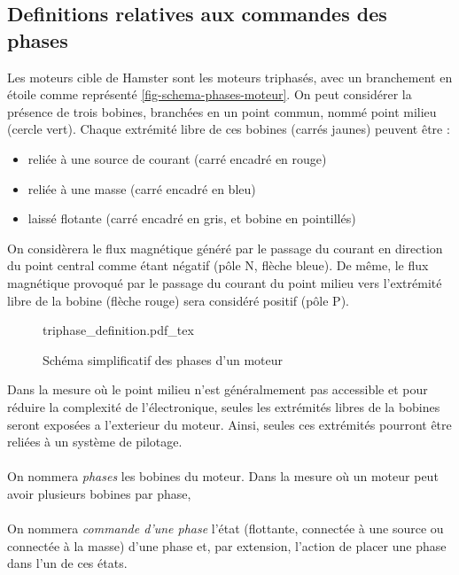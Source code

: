 \subsection{Definitions relatives aux commandes des phases}

Les moteurs cible de Hamster sont les moteurs triphasés, avec un branchement en étoile comme représenté \cref{fig-schema-phases-moteur}.
On peut considérer la présence de trois bobines, branchées en un point commun, nommé point milieu (cercle vert).
Chaque extrémité libre de ces bobines (carrés jaunes) peuvent être :
\begin{itemize}
    \item reliée à une source de courant (carré encadré en rouge)
    \item reliée à une masse (carré encadré en bleu)
    \item laissé flotante (carré encadré en gris, et bobine en pointillés)
\end{itemize}

On considèrera le flux magnétique généré par le passage du courant en direction du point central comme étant négatif (pôle N, flèche bleue).
De même, le flux magnétique provoqué par le passage du courant du point milieu vers l'extrémité libre de la bobine (flèche rouge) sera considéré positif (pôle P).

\begin{figure}[h]
    \centering
    {triphase_definition.pdf_tex}
    \caption{Schéma simplificatif des phases d'un moteur}
    \label{fig-schema_phases_moteur}
\end{figure}

Dans la mesure où le point milieu n'est généralmement pas accessible et pour réduire la complexité de l'électronique, seules les extrémités libres de la bobines seront exposées a l'exterieur du moteur.
Ainsi, seules ces extrémités pourront être reliées à un système de pilotage.

\paragraph{}
On nommera \emph{phases} les bobines du moteur. Dans la mesure où un moteur peut avoir plusieurs bobines par phase, 

\paragraph{}
On nommera \emph{commande d'une phase} l'état (flottante, connectée  à une source ou connectée à la masse) d'une phase et, par extension, l'action de placer une phase dans l'un de ces états.

